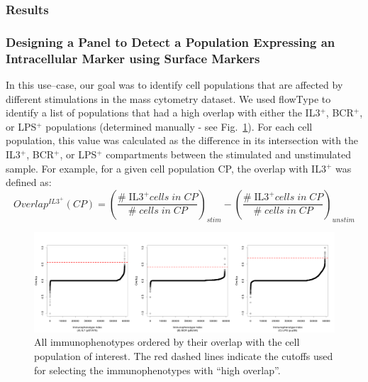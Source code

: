 \subsubsection*{Results}


\subsubsection{Designing a Panel to Detect a Population Expressing an Intracellular Marker using Surface Markers}
In this use--case, our goal was to identify cell populations that are affected by different stimulations in the mass cytometry dataset.
We used flowType to identify a list of populations that had a high overlap with either the IL3$^+$, BCR$^+$, or LPS$^+$ populations (determined manually - see Fig.~\ref{r1:overlaps}).
For each cell population, this value was calculated as the difference in its intersection with the IL3$^+$, BCR$^+$, or LPS$^+$ compartments between the stimulated and unstimulated sample.
For example, for a given cell population CP, the overlap with IL3$^+$ was defined as:
\begin{equation}
  Overlap^{IL3^+}(CP)=\left(\frac{\# \; \mbox{IL3}^+cells \; in \; CP}{\# \; cells \; in \; CP}\right)_{stim}-  \left(\frac{\# \; \mbox{IL3}^+cells \; in \; CP}{\# \; cells \; in \; CP}\right)_{unstim}
\end{equation}

\begin{figure}[!ht]
  \begin{center}
    \includegraphics[width=\textwidth]{figs/rchy/figs/overlaps}
  \end{center}
  \caption{All immunophenotypes ordered by their overlap with the cell population of interest. The red dashed lines indicate the cutoffs used for selecting the immunophenotypes with ``high overlap''.}
  \label{r1:overlaps}
\end{figure}


